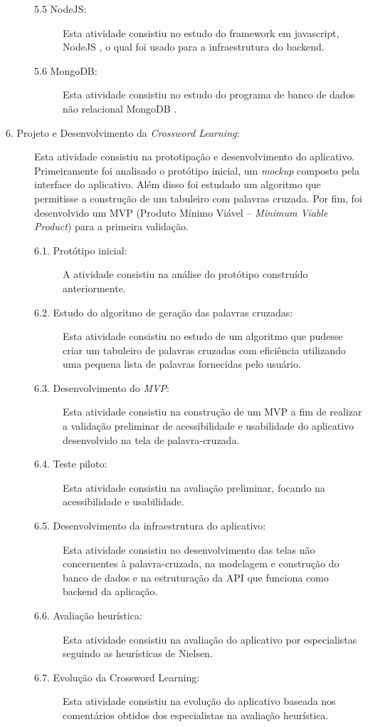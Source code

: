\begin{description}
\begin{description}
\item[5.5 NodeJS:] Esta atividade consistiu no estudo do framework em javascript, NodeJS \citep{nodejs}, o qual foi usado para a infraestrutura do backend.

\item[5.6 MongoDB:] Esta atividade consistiu no estudo do programa de banco de dados não relacional MongoDB \citep{mongodb}.

\end{description}

\item[6. Projeto e Desenvolvimento da \textit{Crossword Learning}:]
Esta atividade consistiu na prototipação e desenvolvimento do aplicativo. Primeiramente foi analisado o protótipo inicial, um \textit{mockup} composto pela interface do aplicativo. Além disso foi estudado um algoritmo que permitisse a construção de um tabuleiro com palavras cruzada. Por fim, foi desenvolvido um MVP (Produto Mínimo Viável -- \textit{Minimum Viable Product})  para a primeira validação.

\begin{description}
    \item[6.1. Protótipo inicial:]
    A atividade consistiu na análise do protótipo construído anteriormente.
    
    \item[6.2. Estudo do algoritmo de geração das palavras cruzadas:]
    Esta atividade consistiu no estudo de um algoritmo que pudesse criar um tabuleiro de palavras cruzadas com eficiência utilizando uma pequena lista de palavras fornecidas pelo usuário.
    
    \item[6.3. Desenvolvimento do \textit{MVP}:] 
    Esta atividade consistiu na construção de um MVP a fim de realizar a validação preliminar de acessibilidade e usabilidade do aplicativo desenvolvido na tela de palavra-cruzada.
    
    \item[6.4. Teste piloto:] 
    Esta atividade consistiu na avaliação preliminar, focando na acessibilidade e usabilidade.
    
    \item[6.5. Desenvolvimento da infraestrutura do aplicativo:] 
    Esta atividade consistiu no desenvolvimento das telas não concernentes à palavra-cruzada, na modelagem e construção do banco de dados e na estruturação da API que funciona como backend da aplicação.
    
    \item[6.6. Avaliação heurística:] 
    Esta atividade consistiu na avaliação do aplicativo por especialistas seguindo as heurísticas de Nielsen.
    
    \item[6.7. Evolução da Crossword Learning:] 
    Esta atividade consistiu na evolução do aplicativo baseada nos comentários obtidos dos especialistas na avaliação heurística.
\end{description}

\end{description}